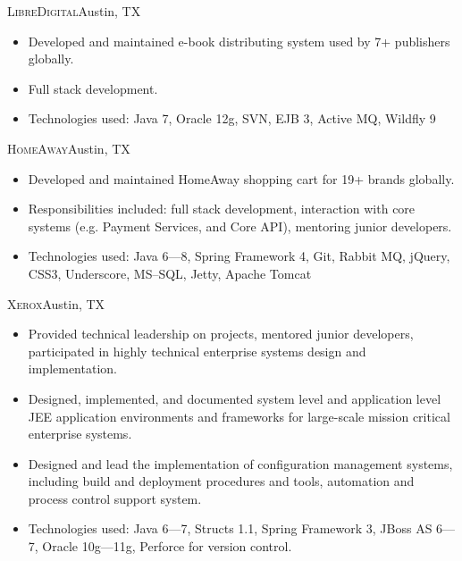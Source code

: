 \documentclass[11pt,letterpaper,sans]{moderncv}
\begin{document}
     {\textsc{LibreDigital}}{Austin, TX}{}
     {\begin{itemize}
         \item Developed and maintained e-book distributing system
               used by 7+ publishers globally.
         \item Full stack development.
         \item Technologies used: Java 7, Oracle 12g, SVN, EJB 3, Active MQ,
               Wildfly 9
     \end{itemize}}

     {\textsc{HomeAway}}{Austin, TX}{}
     {\begin{itemize}
         \item Developed and maintained HomeAway shopping cart for 19+
               brands globally.
         \item Responsibilities included: full stack development, interaction
               with core systems (e.g. Payment Services, and Core API),
               mentoring junior developers.
         \item Technologies used: Java 6---8, Spring Framework 4, Git, Rabbit
               MQ, jQuery, CSS3, Underscore, MS--SQL, Jetty, Apache Tomcat
     \end{itemize}}

     {\textsc{Xerox}}{Austin, TX}{}
     {\begin{itemize}
         \item Provided technical leadership on projects, mentored junior
               developers, participated in highly technical enterprise
               systems design and implementation.
         \item Designed, implemented, and documented system level and
               application level JEE application environments and frameworks
               for large-scale mission critical enterprise systems.
         \item Designed and lead the implementation of configuration
               management systems, including build and deployment procedures
               and tools, automation and process control support system.
         \item Technologies used: Java 6---7, Structs 1.1, Spring Framework
               3, JBoss AS 6---7, Oracle 10g---11g, Perforce for version
               control.
     \end{itemize}}
\end{document}
